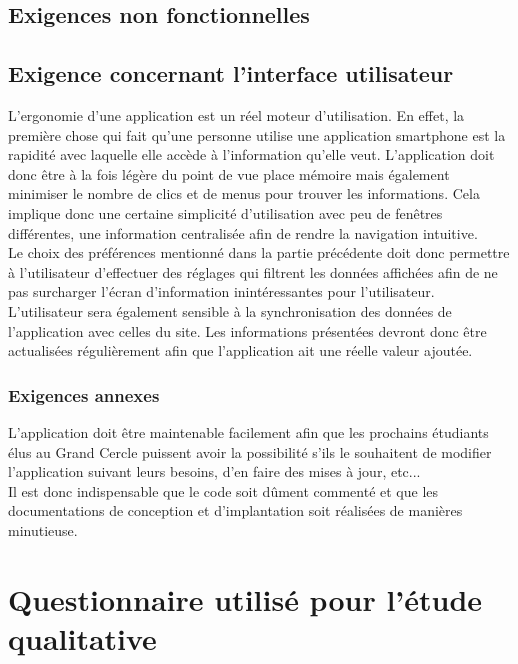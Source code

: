 \documentclass[a4paper, 11px]{article}
\begin{document}
\subsection{Exigences non fonctionnelles}
\subsection{Exigence concernant l'interface utilisateur}
L'ergonomie d'une application est un réel moteur d'utilisation. En effet, la première chose qui fait qu'une personne utilise une application smartphone est la rapidité avec laquelle elle accède à l'information qu'elle veut. L'application doit donc être à la fois légère du point de vue place mémoire mais également minimiser le nombre de clics et de menus pour trouver les informations. Cela implique donc une certaine simplicité d'utilisation avec peu de fenêtres différentes, une information centralisée afin de rendre la navigation intuitive. \\
\indent Le choix des préférences mentionné dans la partie précédente doit donc permettre à l'utilisateur d'effectuer des réglages qui filtrent les données affichées afin de ne pas surcharger l'écran d'information inintéressantes pour l'utilisateur.\\
\indent L'utilisateur sera également sensible à la synchronisation des données de l'application avec celles du site. Les informations présentées devront donc être actualisées régulièrement afin que l'application ait une réelle valeur ajoutée.

\subsubsection{Exigences annexes}
L'application doit être maintenable facilement afin que les prochains étudiants élus au Grand Cercle puissent avoir la possibilité s'ils le souhaitent de modifier l'application suivant leurs besoins, d'en faire des mises à jour, etc...\\
Il est donc indispensable que le code soit dûment commenté et que les documentations de conception et d'implantation soit réalisées de manières minutieuse.


\appendix
\addappheadtotoc

\newpage

\section{Questionnaire utilisé pour l'étude qualitative}
\end{document}
